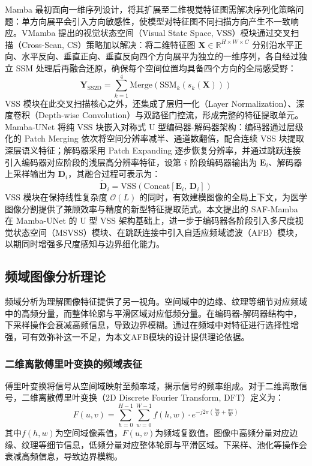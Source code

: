 \documentclass[12pt, a4paper, twoside]{article}
\begin{document}
Mamba 最初面向一维序列设计，将其扩展至二维视觉特征图需解决序列化策略问题：单方向展平会引入方向敏感性，使模型对特征图不同扫描方向产生不一致响应。VMamba 提出的视觉状态空间（Visual State Space, VSS）模块通过交叉扫描（Cross-Scan, CS）策略加以解决：将二维特征图 $\mathbf{X} \in \mathbb{R}^{H \times W \times C}$ 分别沿水平正向、水平反向、垂直正向、垂直反向四个方向展平为独立的一维序列，各自经过独立 SSM 处理后再融合还原，确保每个空间位置均具备四个方向的全局感受野：
\begin{equation}
\mathbf{Y}_{\text{SS2D}} = \sum_{k=1}^{4} \text{Merge}\!\left(\text{SSM}_k\!\left(s_k(\mathbf{X})\right)\right)
\end{equation}
VSS 模块在此交叉扫描核心之外，还集成了层归一化（Layer Normalization）、深度卷积（Depth-wise Convolution）与双路径门控流，形成完整的特征提取单元。Mamba-UNet 将纯 VSS 块嵌入对称式 U 型编码器-解码器架构：编码器通过层级化的 Patch Merging 依次将空间分辨率减半、通道数翻倍，配合连续 VSS 块提取深层语义特征；解码器采用 Patch Expanding 逐步恢复分辨率，并通过跳跃连接引入编码器对应阶段的浅层高分辨率特征，设第 $i$ 阶段编码器输出为 $\mathbf{E}_i$、解码器上采样输出为 $\mathbf{D}_i$，其融合过程可表示为：
\begin{equation}
\tilde{\mathbf{D}}_i = \text{VSS}\!\left(\text{Concat}\!\left[\mathbf{E}_i,\, \mathbf{D}_i\right]\right)
\end{equation}
VSS 模块在保持线性复杂度 $\mathcal{O}(L)$ 的同时，有效建模图像的全局上下文，为医学图像分割提供了兼顾效率与精度的新型特征提取范式。本文提出的 SAF-Mamba 在 Mamba-UNet 的 U 型 VSS 架构基础上，进一步于编码器各阶段引入多尺度视觉状态空间（MSVSS）模块、在跳跃连接中引入自适应频域滤波（AFB）模块，以期同时增强多尺度感知与边界细化能力。

\subsection{频域图像分析理论}

频域分析为理解图像特征提供了另一视角。空间域中的边缘、纹理等细节对应频域中的高频分量，而整体轮廓与平滑区域对应低频分量。在编码器-解码器结构中，下采样操作会衰减高频信息，导致边界模糊。通过在频域中对特征进行选择性增强，可有效弥补这一不足，为本文AFB模块的设计提供理论依据。

\subsubsection{二维离散傅里叶变换的频域表征}

傅里叶变换将信号从空间域映射至频率域，揭示信号的频率组成。对于二维离散信号，二维离散傅里叶变换（2D Discrete Fourier Transform, DFT）定义为：
\begin{equation}
F(u,v) = \sum_{h=0}^{H-1} \sum_{w=0}^{W-1} f(h,w) \cdot e^{-j 2\pi \left( \frac{hu}{H} + \frac{wv}{W} \right)}
\end{equation}
其中$f(h,w)$为空间域像素值，$F(u,v)$为频域复数值。图像中高频分量对应边缘、纹理等细节信息，低频分量对应整体轮廓与平滑区域。下采样、池化等操作会 衰减高频信息，导致边界模糊。
\end{document}
